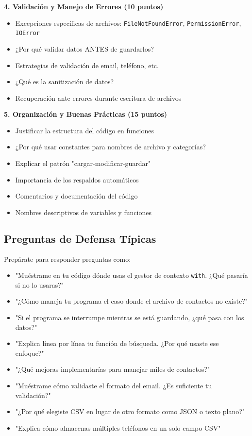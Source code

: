\documentclass[11pt,letterpaper]{article}
\begin{document}
\textbf{4. Validación y Manejo de Errores (10 puntos)}
\begin{itemize}
    \item Excepciones específicas de archivos: \texttt{FileNotFoundError}, \texttt{PermissionError}, \texttt{IOError}
    \item ¿Por qué validar datos ANTES de guardarlos?
    \item Estrategias de validación de email, teléfono, etc.
    \item ¿Qué es la sanitización de datos?
    \item Recuperación ante errores durante escritura de archivos
\end{itemize}

\textbf{5. Organización y Buenas Prácticas (15 puntos)}
\begin{itemize}
    \item Justificar la estructura del código en funciones
    \item ¿Por qué usar constantes para nombres de archivo y categorías?
    \item Explicar el patrón "cargar-modificar-guardar"
    \item Importancia de los respaldos automáticos
    \item Comentarios y documentación del código
    \item Nombres descriptivos de variables y funciones
\end{itemize}

\subsection{Preguntas de Defensa Típicas}

Prepárate para responder preguntas como:

\begin{itemize}
    \item "Muéstrame en tu código dónde usas el gestor de contexto \texttt{with}. ¿Qué pasaría si no lo usaras?"
    \item "¿Cómo maneja tu programa el caso donde el archivo de contactos no existe?"
    \item "Si el programa se interrumpe mientras se está guardando, ¿qué pasa con los datos?"
    \item "Explica línea por línea tu función de búsqueda. ¿Por qué usaste ese enfoque?"
    \item "¿Qué mejoras implementarías para manejar miles de contactos?"
    \item "Muéstrame cómo validaste el formato del email. ¿Es suficiente tu validación?"
    \item "¿Por qué elegiste CSV en lugar de otro formato como JSON o texto plano?"
    \item "Explica cómo almacenas múltiples teléfonos en un solo campo CSV"
\end{itemize}
\end{document}

